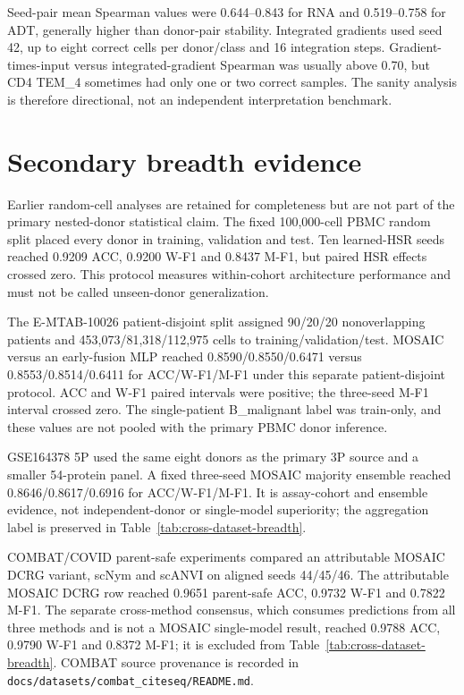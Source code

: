 \documentclass[10pt]{article}
\begin{document}
Seed-pair mean Spearman values were 0.644--0.843 for RNA and 0.519--0.758 for ADT, generally higher than donor-pair stability. Integrated gradients used seed 42, up to eight correct cells per donor/class and 16 integration steps. Gradient-times-input versus integrated-gradient Spearman was usually above 0.70, but CD4 TEM\_4 sometimes had only one or two correct samples. The sanity analysis is therefore directional, not an independent interpretation benchmark.

\section{Secondary breadth evidence}

Earlier random-cell analyses are retained for completeness but are not part of the primary nested-donor statistical claim. The fixed 100,000-cell PBMC random split placed every donor in training, validation and test. Ten learned-HSR seeds reached 0.9209 ACC, 0.9200 W-F1 and 0.8437 M-F1, but paired HSR effects crossed zero. This protocol measures within-cohort architecture performance and must not be called unseen-donor generalization.

The E-MTAB-10026 patient-disjoint split assigned 90/20/20 nonoverlapping patients and 453,073/81,318/112,975 cells to training/validation/test. MOSAIC versus an early-fusion MLP reached 0.8590/0.8550/0.6471 versus 0.8553/0.8514/0.6411 for ACC/W-F1/M-F1 under this separate patient-disjoint protocol. ACC and W-F1 paired intervals were positive; the three-seed M-F1 interval crossed zero. The single-patient B\_malignant label was train-only, and these values are not pooled with the primary PBMC donor inference.

GSE164378 5P used the same eight donors as the primary 3P source and a smaller 54-protein panel. A fixed three-seed MOSAIC majority ensemble reached 0.8646/0.8617/0.6916 for ACC/W-F1/M-F1. It is assay-cohort and ensemble evidence, not independent-donor or single-model superiority; the aggregation label is preserved in Table~\ref{tab:cross-dataset-breadth}.

COMBAT/COVID parent-safe experiments compared an attributable MOSAIC DCRG variant, scNym and scANVI on aligned seeds 44/45/46. The attributable MOSAIC DCRG row reached 0.9651 parent-safe ACC, 0.9732 W-F1 and 0.7822 M-F1. The separate cross-method consensus, which consumes predictions from all three methods and is not a MOSAIC single-model result, reached 0.9788 ACC, 0.9790 W-F1 and 0.8372 M-F1; it is excluded from Table~\ref{tab:cross-dataset-breadth}. COMBAT source provenance is recorded in
\texttt{docs/datasets/combat\_citeseq/README.md}.
\end{document}
